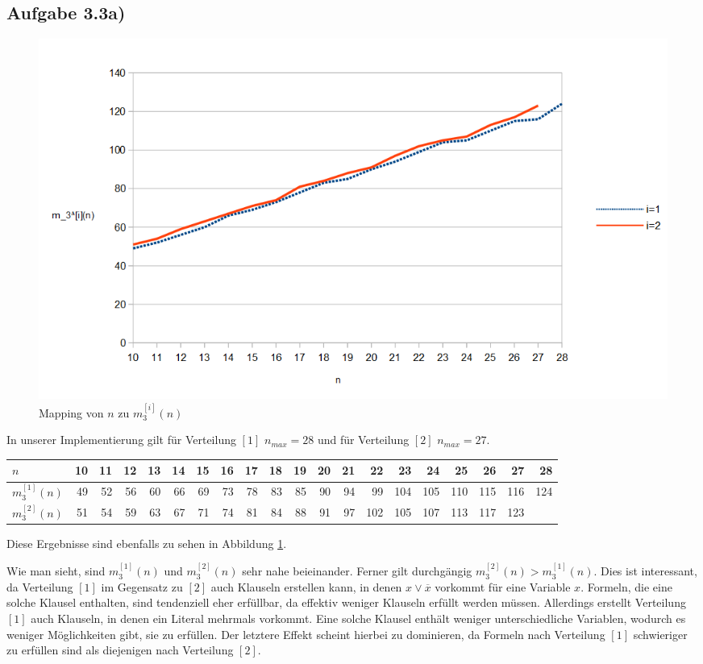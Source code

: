 \documentclass[maincolor=black]{exercise}
\newcommand{\non}[1]{\overline{#1}}
\begin{document}
\subsection{Aufgabe 3.3a)}
\begin{figure}[t]
	\includegraphics[width=\linewidth]{DiagramNew.png}
	\caption{Mapping von $n$ zu $m_3^{[i]}(n)$\label{fig:diagram}}
\end{figure}
In unserer Implementierung gilt für Verteilung $[1]$ $n_{max} = 28$ und für Verteilung $[2]$ $n_{max} = 27$.\\
\begin{adjustwidth}{-1cm}{}
\begin{tabular}{l|rrrrrrrrrrrrrrrrrrr}
	$n$ & 10 & 11 & 12 & 13 & 14 & 15 & 16 & 17 & 18 & 19 & 20 & 21 & 22 & 23 & 24 & 25 & 26 & 27 & 28\\
	\midrule
	$m_3^{[1]}(n)$ & 49 & 52 & 56 & 60 & 66 & 69 & 73 & 78 & 83 & 85 & 90 & 94 & 99 & 104 & 105 & 110 & 115 & 116 & 124\\
	\midrule
	$m_3^{[2]}(n)$ & 51 & 54 & 59 & 63 & 67 & 71 & 74 & 81 & 84 & 88 & 91 & 97 & 102 & 105 & 107 & 113 & 117 & 123 & \\
\end{tabular}
\end{adjustwidth}
\vspace{10pt}
Diese Ergebnisse sind ebenfalls zu sehen in Abbildung \ref{fig:diagram}.\par
Wie man sieht, sind $m_3^{[1]}(n)$ und $m_3^{[2]}(n)$ sehr nahe beieinander. Ferner gilt durchgängig $m_3^{[2]}(n) > m_3^{[1]}(n)$. Dies ist interessant, da Verteilung $[1]$ im Gegensatz zu $[2]$ auch Klauseln erstellen kann, in denen $x \vee \non{x}$ vorkommt für eine Variable $x$. Formeln, die eine solche Klausel enthalten, sind tendenziell eher erfüllbar, da effektiv weniger Klauseln erfüllt werden müssen. Allerdings erstellt Verteilung $[1]$ auch Klauseln, in denen ein Literal mehrmals vorkommt. Eine solche Klausel enthält weniger unterschiedliche Variablen, wodurch es weniger Möglichkeiten gibt, sie zu erfüllen. Der letztere Effekt scheint hierbei zu dominieren, da Formeln nach Verteilung $[1]$ schwieriger zu erfüllen sind als diejenigen nach Verteilung $[2]$.\par
\end{document}
